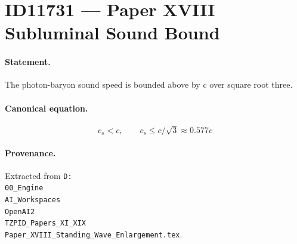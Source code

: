 \section*{ID11731 --- Paper XVIII Subluminal Sound Bound}

\paragraph{Statement.}
The photon-baryon sound speed is bounded above by c over square root three.

\paragraph{Canonical equation.}
\[
c_s<c,\qquad c_s\le c/\sqrt{3}\approx0.577c
\]

\paragraph{Provenance.}
Extracted from \texttt{D:\\00\_Engine\\AI\_Workspaces\\OpenAI2\\TZPID\_Papers\_XI\_XIX\\Paper\_XVIII\_Standing\_Wave\_Enlargement.tex}.
